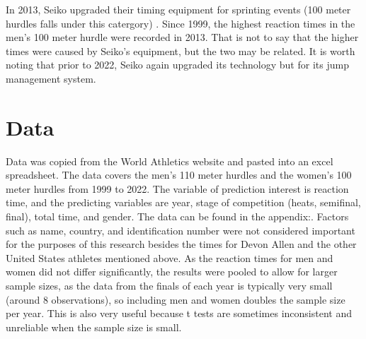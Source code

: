 \documentclass[12pt, letterpaper, titlepage]{article}
\begin{document}
In 2013, Seiko upgraded their timing equipment for sprinting events (100 meter hurdles
falls under this catergory) \citep{WorldAthletics_2013}.  Since 1999, the highest reaction 
times in the men's 100 meter hurdle were recorded in 2013.  That is not to say that the higher 
times were caused by Seiko's equipment, but the two may be related.  It is worth noting that prior
to 2022, Seiko again upgraded its technology but for its jump management system.
\citep{Pilianidis}



\section{Data}
\label{sec:data}
Data was copied from the World Athletics website and pasted into an excel
spreadsheet. The data covers the men's 110 meter hurdles and the women's 100
meter hurdles from 1999 to 2022.  The variable of prediction interest is reaction
time, and the predicting variables are year, stage of competition (heats, 
semifinal, final), total time, and gender.  The data can be found in the appendix:.  
Factors such as name, country, and identification number were
not considered important for the purposes of this research besides the times for
Devon Allen and the other United States athletes mentioned above.  As the reaction
times for men and women did not differ significantly, the results were pooled
to allow for larger sample sizes, as the data from the finals of each year is
typically very small (around 8 observations), so including men and women doubles
the sample size per year.  This is also very useful because t tests are sometimes
inconsistent and unreliable when the sample size is small.
\end{document}
